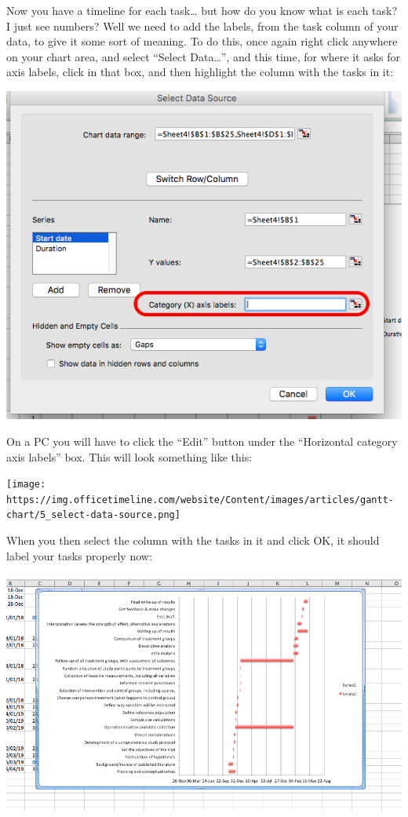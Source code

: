 \documentclass[
]{book}
\begin{document}
Now you have a timeline for each task\ldots{} but how do you know what is each task? I just see numbers? Well we need to add the labels, from the task column of your data, to give it some sort of meaning. To do this, once again right click anywhere on your chart area, and select ``Select Data\ldots{}'', and this time, for where it asks for axis labels, click in that box, and then highlight the column with the tasks in it:

\includegraphics{imgs/axis_labels_gantt.png}

On a PC you will have to click the ``Edit'' button under the ``Horizontal category axis labels'' box. This will look something like this:

\texttt{[image: https://img.officetimeline.com/website/Content/images/articles/gantt-chart/5\_select-data-source.png]}

When you then select the column with the tasks in it and click OK, it should label your tasks properly now:

\includegraphics{imgs/gantt_labelled.png}
\end{document}
